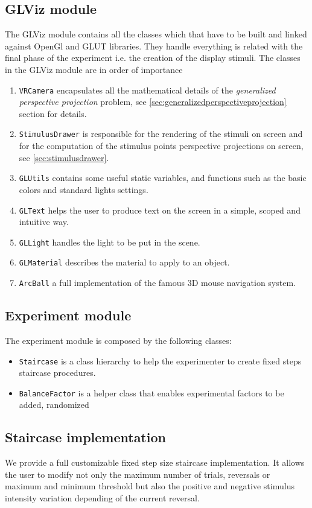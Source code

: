 \documentclass[acmtocl,acmnow]{acmtrans2m}
\begin{document}
\subsection{GLViz module}
The GLViz module contains all the classes which that have to be built and linked
against OpenGl and GLUT libraries. They handle everything is related with the
final phase of the experiment i.e. the creation of the display
stimuli.
The classes in the GLViz module are in order of importance
\begin{enumerate}
 \item \verb=VRCamera= encapsulates all the mathematical details of the
\emph{generalized perspective projection} problem, see
\ref{sec:generalizedperspectiveprojection} section for details.
 \item \verb=StimulusDrawer= is responsible for the rendering of the stimuli on
screen and for the computation of the stimulus points perspective projections on screen, see \ref{sec:stimulusdrawer}.
 \item \verb=GLUtils= contains some useful static variables, and functions such
as the basic colors and standard lights settings. 
 \item \verb=GLText= helps the user to produce text on the screen in a simple,
scoped and intuitive way.
 \item \verb=GLLight= handles the light to be put in the scene.
 \item \verb=GLMaterial= describes the material to apply to an object.
 \item \verb=ArcBall= a full implementation of the famous 3D mouse navigation
system.
\end{enumerate}

\subsection{Experiment module}
The experiment module is composed by the following classes:
\begin{itemize}
\item \verb=Staircase= is a class hierarchy to help the experimenter to create fixed steps staircase procedures.
\item \verb=BalanceFactor= is a helper class that enables experimental factors to be added, randomized 
\end{itemize}

\subsection{Staircase implementation}
We provide a full customizable fixed step size staircase implementation.
It allows the user to modify not only the maximum number of trials, reversals or maximum and minimum threshold but also
the positive and negative stimulus intensity variation depending of the current reversal.
\end{document}
